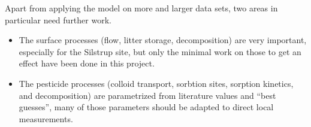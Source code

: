\documentclass[a4paper]{article}
\begin{document}
\begin{text}
Apart from applying the model on more and larger data sets, two areas
in particular need further work.
\begin{itemize}
\item The surface processes (flow, litter storage, decomposition) are
  very important, especially for the Silstrup site, but only the
  minimal work on those to get an effect have been done in this project.
\item The pesticide processes (colloid transport, sorbtion sites,
  sorption kinetics, and decomposition) are parametrized from
  literature values and ``best guesses'', many of those parameters
  should be adapted to direct local measurements.
\end{itemize}



\end{text}
  
\end{document}
